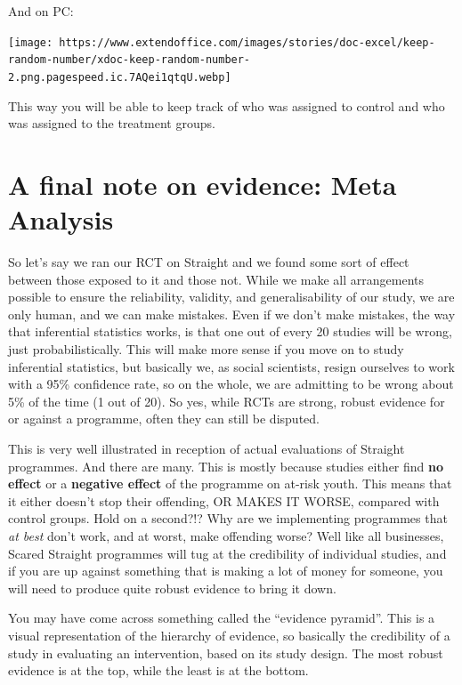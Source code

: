 \documentclass[]{book}
\theoremstyle{definition}
\theoremstyle{definition}
\theoremstyle{definition}
\theoremstyle{remark}
\begin{document}
And on PC:

\texttt{[image: https://www.extendoffice.com/images/stories/doc-excel/keep-random-number/xdoc-keep-random-number-2.png.pagespeed.ic.7AQei1qtqU.webp]}

This way you will be able to keep track of who was assigned to control
and who was assigned to the treatment groups.

\hypertarget{a-final-note-on-evidence-meta-analysis}{%
\section{A final note on evidence: Meta
Analysis}\label{a-final-note-on-evidence-meta-analysis}}

So let's say we ran our RCT on Straight and we found some sort of effect
between those exposed to it and those not. While we make all
arrangements possible to ensure the reliability, validity, and
generalisability of our study, we are only human, and we can make
mistakes. Even if we don't make mistakes, the way that inferential
statistics works, is that one out of every 20 studies will be wrong,
just probabilistically. This will make more sense if you move on to
study inferential statistics, but basically we, as social scientists,
resign ourselves to work with a 95\% confidence rate, so on the whole,
we are admitting to be wrong about 5\% of the time (1 out of 20). So
yes, while RCTs are strong, robust evidence for or against a programme,
often they can still be disputed.

This is very well illustrated in reception of actual evaluations of
Straight programmes. And there are many. This is mostly because studies
either find \textbf{no effect} or a \textbf{negative effect} of the
programme on at-risk youth. This means that it either doesn't stop their
offending, OR MAKES IT WORSE, compared with control groups. Hold on a
second?!? Why are we implementing programmes that \emph{at best} don't
work, and at worst, make offending worse? Well like all businesses,
Scared Straight programmes will tug at the credibility of individual
studies, and if you are up against something that is making a lot of
money for someone, you will need to produce quite robust evidence to
bring it down.

You may have come across something called the ``evidence pyramid''. This
is a visual representation of the hierarchy of evidence, so basically
the credibility of a study in evaluating an intervention, based on its
study design. The most robust evidence is at the top, while the least is
at the bottom.
\end{document}
